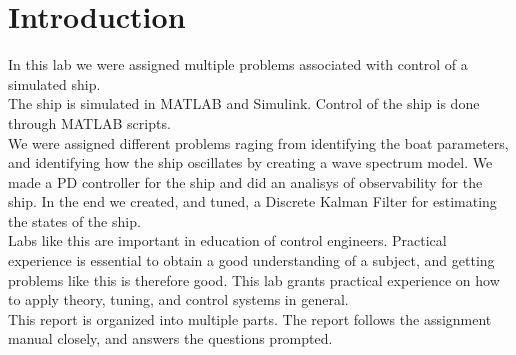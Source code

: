 \section{Introduction}\label{sec:intro}
In this lab we were assigned multiple problems associated with control of a simulated ship. \\
The ship is simulated in MATLAB and Simulink. Control of the ship is done through MATLAB scripts. \\
We were assigned different problems raging from identifying the boat parameters, and identifying how the ship oscillates by creating a wave spectrum model. We made a PD controller for the ship and did an analisys of observability for the ship. In the end we created, and tuned, a Discrete Kalman Filter for estimating the states of the ship. \\
Labs like this are important in education of control engineers. Practical experience is essential to obtain a good understanding of a subject, and getting problems like this is therefore good. This lab grants practical experience on how to apply theory, tuning, and control systems in general.\\
This report is organized into multiple parts. The report follows the assignment manual closely, and answers the questions prompted. 
